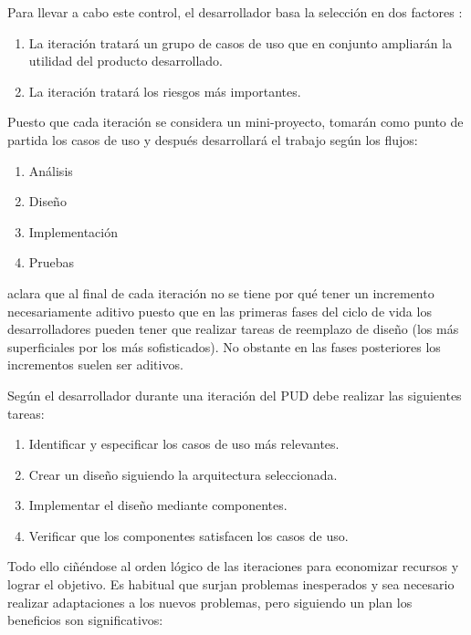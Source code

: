 Para llevar a cabo este control, el desarrollador basa la selección en dos
factores \cite{rumbaugh_jacobson_pud}: 

\begin{enumerate}
\item La iteración tratará un grupo de casos de uso que en conjunto ampliarán la
  utilidad del producto desarrollado. 
\item La iteración tratará los riesgos más importantes. 
\end{enumerate}

Puesto que cada iteración se considera un mini-proyecto, tomarán como punto de
partida los casos de uso y después desarrollará el trabajo según  los flujos: 

\begin{enumerate}
\item Análisis
\item Diseño
\item Implementación
\item Pruebas
\end{enumerate}

\cite{rumbaugh_jacobson_pud} aclara que al final de cada iteración no se tiene
por qué tener un incremento necesariamente aditivo puesto que en las primeras
fases del ciclo de vida los desarrolladores pueden tener que realizar tareas de
reemplazo de diseño (los más superficiales por los más sofisticados). No
obstante en las fases posteriores los incrementos suelen ser aditivos. 

Según \cite{rumbaugh_jacobson_pud}  el desarrollador durante una iteración del
\acs{PUD} debe realizar las siguientes tareas: 

\begin{enumerate}
\item Identificar y especificar los casos de uso más relevantes. 
\item Crear un diseño siguiendo la arquitectura seleccionada. 
\item Implementar el diseño mediante componentes. 
\item Verificar que los componentes satisfacen los casos de uso. 
\end{enumerate}

Todo ello ciñéndose al orden lógico de las iteraciones para economizar recursos
y lograr el objetivo. Es habitual que surjan problemas inesperados y sea
necesario realizar adaptaciones a los nuevos problemas, pero siguiendo un plan
los beneficios son significativos:


